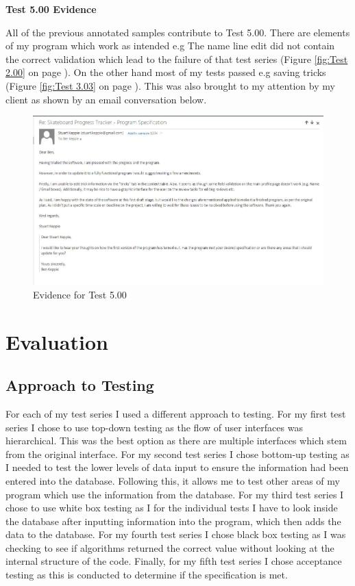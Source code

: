 \textbf{Test 5.00 Evidence}

All of the previous annotated samples contribute to Test 5.00. There are elements of my program which work as intended e.g The name line edit did not contain the correct validation which lead to the failure of that test series  (Figure \ref{fig:Test 2.00} on page \pageref{fig:Test 2.00}). On the other hand most of my tests passed e.g saving tricks  (Figure \ref{fig:Test 3.03} on page \pageref{fig:Test 3.03}). This was also brought to my attention by my client as shown by an email conversation below.


\begin{figure}[H]
    \includegraphics[width=\textwidth]{./Testing/AnnotatedSamples/StuartEmail.jpg}
    \caption{Evidence for Test 5.00} \label{fig:Test 5.00}
\end{figure}



\section{Evaluation}

\subsection{Approach to Testing} %

For each of my test series I used a different approach to testing. For my first test series I chose to use top-down testing as the flow of user interfaces was hierarchical. This was the best option as there are multiple interfaces which stem from the original interface. For my second test series I chose bottom-up testing as I needed to test the lower levels of data input to ensure the information had been entered into the database. Following this, it allows me to test other areas of my program which use the information from the database. For my third test series I chose to use white box testing as I for the individual tests I have to look inside the database after inputting information into the program, which then adds the data to the database. For my fourth test series I chose black box testing as I was checking to see if algorithms returned the correct value without looking at the internal structure of the code. Finally, for my fifth test series I chose acceptance testing as this is conducted to determine if the specification is met.


